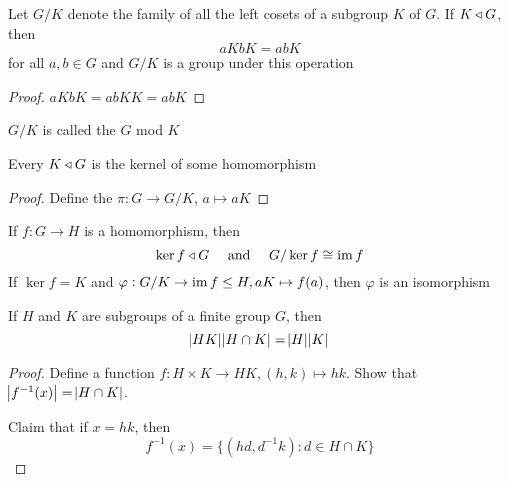 \documentclass[11pt]{article}
\begin{document}
\begin{theorem}[]
Let \(G/K\) denote the family of all the left cosets of a subgroup \(K\) of \(G\).
If \(K\triangleleft G\), then
\begin{equation*}
aKbK=abK
\end{equation*}
for all \(a,b\in G\) and \(G/K\) is a group under this operation
\end{theorem}

\begin{proof}
\(aKbK=abKK=abK\)
\end{proof}

\(G/K\) is called the  \(G\) mod \(K\)

\begin{corollary}[]
Every \(K\triangleleft G\) is the kernel of some homomorphism
\end{corollary}

\begin{proof}
Define the  \(\pi:G\to G/K\), \(a\mapsto aK\)
\end{proof}

\begin{theorem}
If \(f:G\to H\) is a homomorphism, then
\begin{equation*}
\operatorname{ker} f\triangleleft G\quad\text{ and }\quad G/\operatorname{ker} f\cong\operatorname{im} f
\end{equation*}
If \(\ker f=K\) and \(\varphi:G/K\to\operatorname{im} f\le H,aK\mapsto f(a)\), then \(\varphi\)
is an isomorphism
\end{theorem}

\quad
{}

\begin{proposition}
If \(H\) and \(K\) are subgroups of a finite group \(G\), then
\begin{equation*}
\abs{HK}\abs{H\cap K}=\abs{H}\abs{K}
\end{equation*}
\end{proposition}

\begin{proof}
Define a function \(f:H\times K\to HK,(h,k)\mapsto hk\). Show that
\(\abs{f^{-1}(x)}=\abs{H\cap K}\). 

Claim that if \(x=hk\), then
\begin{equation*}
f^{-1}(x)=\{(hd,d^{-1}k):d\in H\cap K\}
\end{equation*}
\end{proof}
\end{document}
